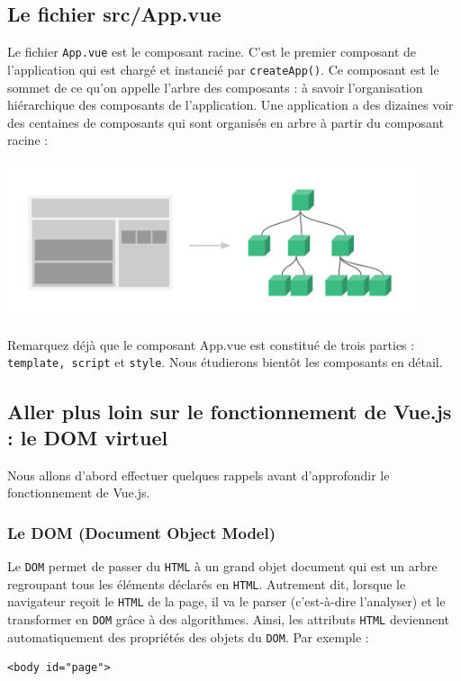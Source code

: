 \subsection{Le fichier {\color{monOrange}src/App.vue}}
Le fichier {\tt App.vue} est le composant racine. C'est le premier composant de l'application qui est chargé et instancié par {\tt createApp()}. Ce composant est le sommet de ce qu'on appelle l'arbre des composants : à savoir l'organisation hiérarchique des composants de l'application. Une application a des dizaines voir des centaines de composants qui sont organisés en arbre à partir du composant racine :
\begin{center}
\includegraphics[width=12cm]{images/image06.png}
\end{center}

Remarquez déjà que le composant {\color{monOrange}App.vue} est constitué de trois parties : {\tt template, script} et {\tt style}. Nous étudierons bientôt les composants en détail.

\subsection{Aller plus loin sur le fonctionnement de Vue.js : le {\color{monOrange}DOM virtuel}}
Nous allons d'abord effectuer quelques rappels avant d'approfondir le fonctionnement de Vue.js.
\subsubsection{Le DOM (Document Object Model)}
Le {\tt DOM} permet de passer du {\tt HTML} à un grand objet document qui est un arbre regroupant tous les éléments déclarés en {\tt HTML}. Autrement dit, lorsque le navigateur reçoit le {\tt HTML} de la page, il va le parser (c'est-à-dire l'analyser) et le transformer en {\tt DOM} grâce à des algorithmes. Ainsi, les attributs {\tt HTML} deviennent automatiquement des propriétés des objets du {\tt DOM}. Par exemple :
\begin{verbatim}
<body id="page">
\end{verbatim} 

